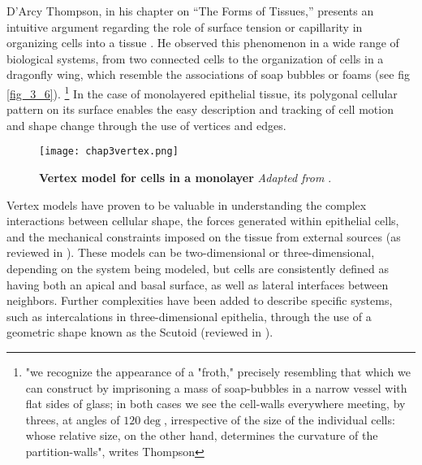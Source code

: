 D'Arcy Thompson, in his chapter on ``The Forms of Tissues,'' presents an intuitive argument regarding the role of surface tension or capillarity in organizing cells into a tissue \cite{thompson1979, graner2017}. He observed this phenomenon in a wide range of biological systems, from two connected cells to the organization of cells in a dragonfly wing, which resemble the
associations of soap bubbles or foams (see fig \ref{fig_3_6}).
\footnote{"we recognize the appearance of a "froth," precisely resembling that which we can construct by imprisoning a mass of soap-bubbles in a narrow vessel with flat sides of glass; in both cases we see the cell-walls everywhere meeting, by threes, at angles of $120 \deg$, irrespective of the size of the individual cells: whose relative size, on the other hand, determines the curvature of the partition-walls", writes Thompson}
In the case of monolayered epithelial tissue, its polygonal cellular pattern on its surface enables the easy description and tracking of cell motion and shape change through the use of vertices and edges.
\begin{wrapfigure}{r}{5.5cm}
	\caption{\textbf{Vertex model for cells in a monolayer} \textit{Adapted from \cite{gomez-gonzalez2020}}.}\label{fig_3_7}
	\texttt{[image: chap3vertex.png]}
\end{wrapfigure} 
Vertex models have proven to be valuable in understanding the complex interactions between cellular shape, the forces generated within epithelial cells, and the mechanical constraints imposed on the tissue from external sources (as reviewed in \cite{alt2017}). These models can be two-dimensional or three-dimensional, depending on the system being modeled, but cells are consistently defined as having both an apical and basal surface, as well as lateral interfaces between neighbors. Further complexities have been added to describe specific systems, such as intercalations in three-dimensional epithelia, through the use of a geometric shape known as the Scutoid (reviewed in \cite{gomez-galvez2021}).

